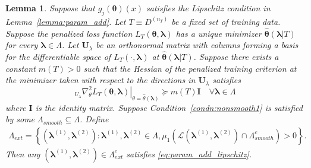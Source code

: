 \documentclass[10pt]{book}
\newtheorem{lemma}{Lemma}
\theoremstyle{definition}
\begin{document}
\begin{lemma}
	Suppose that $g_j(\boldsymbol{\theta})(x)$ satisfies the Lipschitz condition in Lemma~\ref{lemma:param_add}.
	Let $T\equiv D^{(n_{T})}$ be a fixed set of training data. Suppose
	the penalized loss function $L_{T}\left(\boldsymbol{\theta},\boldsymbol{\lambda}\right)$
	has a unique minimizer $\hat{\boldsymbol{\theta}}(\boldsymbol{\lambda}|T)$
	for every $\boldsymbol{\lambda}\in\Lambda$. Let $\boldsymbol{U}_{\lambda}$
	be an orthonormal matrix with columns forming a basis for the differentiable
	space of $L_{T}(\cdot,\boldsymbol{\lambda})$ at $\hat{\boldsymbol{\theta}}(\boldsymbol{\lambda}|T)$.
	Suppose there exists a constant $m(T)>0$ such that the Hessian of
	the penalized training criterion at the minimizer taken with respect
	to the directions in $\boldsymbol{U}_{\lambda}$ satisfies 
	\begin{equation}
	\left._{U_{\lambda}}\nabla_{\theta}^{2}L_{T}(\boldsymbol{\theta},\boldsymbol{\lambda})\right|_{\theta=\hat{\theta}(\boldsymbol{\lambda})}\succeq m(T)\boldsymbol{I}\quad\forall\boldsymbol{\lambda}\in\Lambda
	\end{equation}
	where \textup{$\boldsymbol{I}$ is the identity matrix.}
	Suppose Condition~\ref{condn:nonsmooth1} is satisfied by some $\Lambda_{smooth}\subseteq\Lambda$.
	Define
	\begin{align}
	\Lambda_{ext}=\left\{ (\boldsymbol{\lambda}^{(1)},\boldsymbol{\lambda}^{(2)}):
	\boldsymbol{\lambda}^{(1)},\boldsymbol{\lambda}^{(2)} \in \Lambda,
	\mu_{1}\left(\mathcal{L}(\boldsymbol{\lambda}^{(1)},\boldsymbol{\lambda}^{(2)})\cap\Lambda_{smooth}^{c}\right)>0\right\}.
	\label{eq:lambda_ext}
	\end{align}
	Then any $(\boldsymbol{\lambda}^{(1)},\boldsymbol{\lambda}^{(2)})\in\Lambda_{ext}^{c}$
	satisfies \eqref{eq:param_add_lipschitz}.
	\label{lemma:lipschitz_lambda_ext_c}
\end{lemma}
\end{document}
